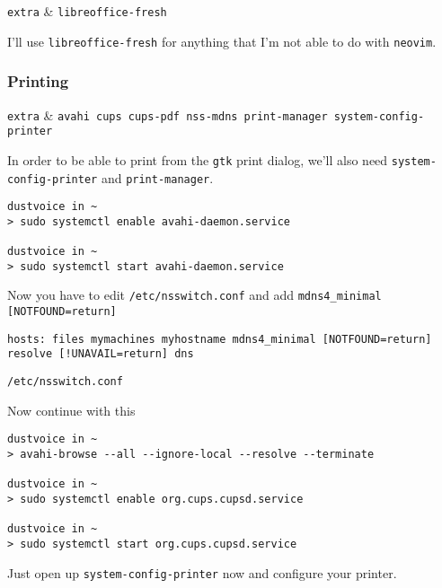 \documentclass[10pt]{dustdoc}
\begin{document}
\begin{pkgtable}
    \texttt{extra} & \texttt{libreoffice-fresh} \\
\end{pkgtable}

I’ll use \texttt{libreoffice-fresh} for anything that I’m not able to do with \texttt{neovim}.

\subsubsection{Printing}%
\label{sec:printing}

\begin{pkgtable}
    \texttt{extra} & \texttt{avahi cups cups-pdf nss-mdns print-manager system-config-printer} \\
\end{pkgtable}

In order to be able to print from the \texttt{gtk} print dialog, we’ll also need \texttt{system-config-printer} and \texttt{print-manager}.

\begin{verbatim}
dustvoice in ~
> sudo systemctl enable avahi-daemon.service

dustvoice in ~
> sudo systemctl start avahi-daemon.service
\end{verbatim}


Now you have to edit \texttt{/etc/nsswitch.conf} and add\newline
\texttt{mdns4_minimal [NOTFOUND=return]}

\begin{mintedlisting}
    \begin{verbatim}
hosts: files mymachines myhostname mdns4_minimal [NOTFOUND=return] resolve [!UNAVAIL=return] dns
    \end{verbatim}

    \caption{\texttt{/etc/nsswitch.conf}}
\end{mintedlisting}

Now continue with this

\begin{verbatim}
dustvoice in ~
> avahi-browse --all --ignore-local --resolve --terminate

dustvoice in ~
> sudo systemctl enable org.cups.cupsd.service

dustvoice in ~
> sudo systemctl start org.cups.cupsd.service
\end{verbatim}


Just open up \texttt{system-config-printer} now and configure your printer.
\end{document}
